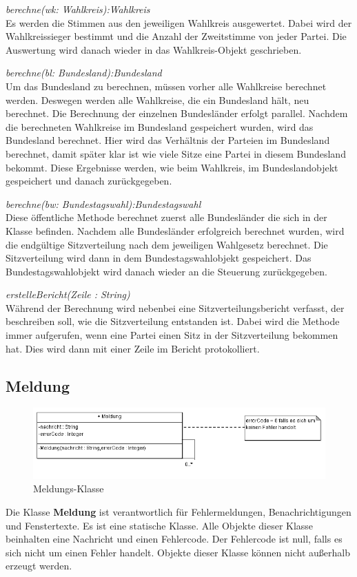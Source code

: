 \documentclass[12pt,a4paper,titlepage]{article}
\newcommand{\myma}{\fontfamily{pcr}\selectfont \textbf}
\newcommand{\mymo}{\fontfamily{pcr}\selectfont \textit}
\begin{document}
\begin{description}

\item {\mymo{berechne(wk: Wahlkreis):Wahlkreis}} \\
Es werden die Stimmen aus den jeweiligen Wahlkreis ausgewertet. Dabei wird der Wahlkreissieger bestimmt und die Anzahl der Zweitstimme von jeder Partei. Die Auswertung wird danach wieder in das Wahlkreis-Objekt geschrieben.
\item {\mymo{berechne(bl: Bundesland):Bundesland}} \\
Um das Bundesland zu berechnen, müssen vorher alle Wahlkreise berechnet werden. Deswegen werden alle Wahlkreise, die ein Bundesland hält, neu berechnet. Die Berechnung der einzelnen Bundesländer erfolgt parallel. Nachdem die berechneten Wahlkreise im Bundesland gespeichert wurden, wird das Bundesland berechnet. Hier wird das Verhältnis der Parteien im Bundesland berechnet, damit später klar ist wie viele Sitze eine Partei in diesem Bundesland bekommt. Diese Ergebnisse werden, wie beim Wahlkreis, im Bundeslandobjekt gespeichert und danach zurückgegeben. 
\item {\mymo{berechne(bw: Bundestagswahl):Bundestagswahl}} \\
Diese öffentliche Methode berechnet zuerst alle Bundesländer die sich in der Klasse befinden. Nachdem alle Bundesländer erfolgreich berechnet wurden, wird die endgültige Sitzverteilung nach dem jeweiligen Wahlgesetz berechnet. Die Sitzverteilung wird dann in dem Bundestagswahlobjekt gespeichert. Das Bundestagswahlobjekt wird danach wieder an die Steuerung zurückgegeben.
\item {\mymo{erstelleBericht(Zeile : String)}} \\
Während der Berechnung wird nebenbei eine Sitzverteilungsbericht verfasst, der beschreiben soll, wie die Sitzverteilung entstanden ist. Dabei wird die Methode immer aufgerufen, wenn eine Partei einen Sitz in der Sitzverteilung bekommen hat. Dies wird dann mit einer Zeile im Bericht protokolliert.
\end{description} 

\subsection{Meldung}
\begin{figure}[!ht]
\centering
\includegraphics[scale=0.8]{Meldung_Ausschnitt.png} \caption{Meldungs-Klasse} 
\end{figure}
Die Klasse {\myma{Meldung}} ist verantwortlich für Fehlermeldungen, Benachrichtigungen und Fenstertexte. Es ist eine statische Klasse. Alle Objekte dieser Klasse beinhalten eine Nachricht und einen Fehlercode. Der Fehlercode ist null, falls es sich nicht um einen Fehler handelt.
Objekte dieser Klasse können nicht außerhalb erzeugt werden.
\end{document}
